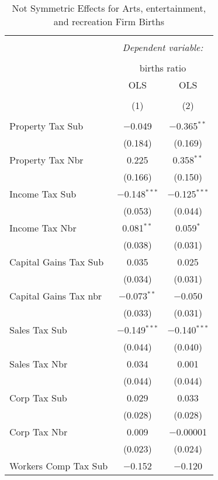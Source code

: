 
\begin{table}[!htbp] \centering 
  \caption{Not Symmetric Effects for  Arts, entertainment, and recreation Firm Births} 
  \label{71noequality} 
\footnotesize 
\begin{tabular}{@{\extracolsep{5pt}}lcc} 
\\[-1.8ex]\hline 
\hline \\[-1.8ex] 
 & \multicolumn{2}{c}{\textit{Dependent variable:}} \\ 
\cline{2-3} 
\\[-1.8ex] & \multicolumn{2}{c}{births ratio} \\ 
 & OLS & OLS \\ 
\\[-1.8ex] & (1) & (2)\\ 
\hline \\[-1.8ex] 
 Property Tax Sub & $-$0.049 & $-$0.365$^{**}$ \\ 
  & (0.184) & (0.169) \\ 
  Property Tax Nbr & 0.225 & 0.358$^{**}$ \\ 
  & (0.166) & (0.150) \\ 
  Income Tax Sub & $-$0.148$^{***}$ & $-$0.125$^{***}$ \\ 
  & (0.053) & (0.044) \\ 
  Income Tax Nbr & 0.081$^{**}$ & 0.059$^{*}$ \\ 
  & (0.038) & (0.031) \\ 
  Capital Gains Tax Sub & 0.035 & 0.025 \\ 
  & (0.034) & (0.031) \\ 
  Capital Gains Tax nbr & $-$0.073$^{**}$ & $-$0.050 \\ 
  & (0.033) & (0.031) \\ 
  Sales Tax Sub & $-$0.149$^{***}$ & $-$0.140$^{***}$ \\ 
  & (0.044) & (0.040) \\ 
  Sales Tax Nbr & 0.034 & 0.001 \\ 
  & (0.044) & (0.044) \\ 
  Corp Tax Sub & 0.029 & 0.033 \\ 
  & (0.028) & (0.028) \\ 
  Corp Tax Nbr & 0.009 & $-$0.00001 \\ 
  & (0.023) & (0.024) \\ 
  Workers Comp Tax Sub & $-$0.152 & $-$0.120 \\ 

\end{tabular}
\end{table}

